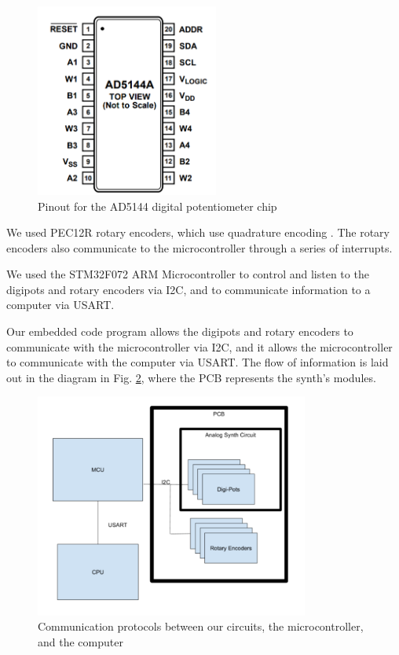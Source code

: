 \documentclass[letterpaper, 12 pt, conference]{ieeeconf}
\begin{document}
\begin{figure}[ht]
\includegraphics[width=6cm]{pot}
\centering
\caption{Pinout for the AD5144 digital potentiometer chip \cite{pot}}
\label{potpin}
\end{figure}

We used PEC12R rotary encoders, which use quadrature encoding \cite{rotenc}. The rotary encoders also communicate to the microcontroller through a series of interrupts.

We used the STM32F072 ARM Microcontroller to control and listen to the digipots and rotary encoders via I2C, and to communicate information to a computer via USART.

Our embedded code program allows the digipots and rotary encoders to communicate with the microcontroller via I2C, and it allows the microcontroller to communicate with the computer via USART. The flow of information is laid out in the diagram in Fig. \ref{i2cfig}, where the PCB represents the synth's modules. 

\begin{figure}[ht]
\includegraphics[width=9cm]{i2c}
\centering
\caption{Communication protocols between our circuits, the microcontroller, and the computer}
\label{i2cfig}
\end{figure}
\end{document}
